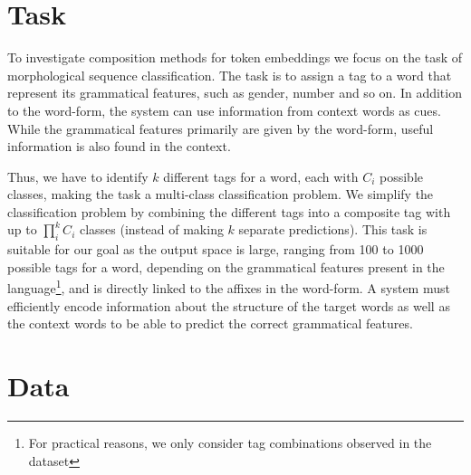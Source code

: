 \documentclass[11pt]{article}
\begin{document}
    \section{Task}

            To investigate composition methods for token embeddings
     we focus on the task of morphological sequence
     classification. The task is to assign a tag to a word that
     represent its grammatical features, such as gender, number and so
     on.
            In addition to the word-form, the system can use
     information from context words as cues. While the grammatical
     features primarily are given by the word-form, useful information
     is also found in the context.


                Thus, we have to identify $k$ different tags for a
     word, each with $C_i$ possible classes, making the task a
     multi-class classification problem. We simplify the
     classification problem by combining the different tags into a
     composite tag with up to $\prod _i^k C_i$ classes (instead of
     making $k$ separate predictions).
%
        This task is suitable for our goal as the output space is
     large, ranging from 100 to 1000 possible tags for a word,
     depending on the grammatical features present in the
     language\footnote{For practical reasons, we only consider tag
     combinations observed in the dataset}, and is directly linked to
     the affixes in the word-form. A system must efficiently encode
     information about the structure of the target words as well as
     the context words to be able to predict the correct grammatical
     features.
    
    \section{Data}
    
\end{document}
